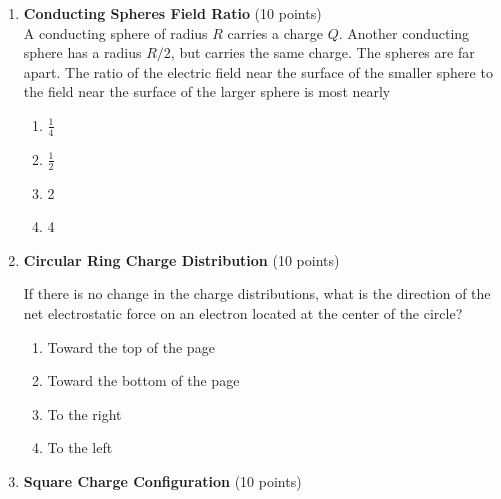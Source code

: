\begin{enumerate}
  \item \textbf{Conducting Spheres Field Ratio} (10 points)\\
  A conducting sphere of radius $R$ carries a charge $Q$. Another conducting sphere has a radius $R/2$, but carries the same charge. The spheres are far apart. The ratio of the electric field near the surface of the smaller sphere to the field near the surface of the larger sphere is most nearly
  \begin{enumerate}[label=(\Alph*)]
    \item $\frac{1}{4}$
    \item $\frac{1}{2}$
    \item 2
    \item 4
  \end{enumerate}
  \begin{subanswer}
  \end{subanswer}

  \item \textbf{Circular Ring Charge Distribution} (10 points)\\
  
  If there is no change in the charge distributions, what is the direction of the net electrostatic force on an electron located at the center of the circle?
  \begin{enumerate}[label=(\Alph*)]
    \item Toward the top of the page
    \item Toward the bottom of the page
    \item To the right
    \item To the left
  \end{enumerate}
  \begin{subanswer}
  \end{subanswer}

  \item \textbf{Square Charge Configuration} (10 points)\\
  

\end{enumerate}
